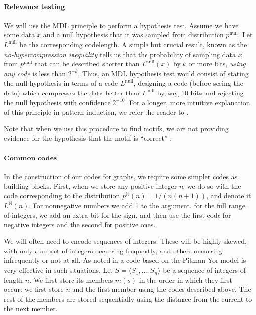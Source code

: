 \documentclass[letterpaper]{article} %
\newcommand{\N}{{\mathbb N}}
\begin{document}

\paragraph{Relevance testing} We will use the MDL principle to perform a hypothesis test. Assume we have some data $x$ and a null hypothesis that it was sampled from distribution $p^\text{null}$. Let $L^\text{null}$ be the corresponding codelength. A simple but crucial result, known as the \emph{no-hypercompression inequality} \cite[p103]{grunwald2007minimum} tells us that the probability of sampling data $x$ from $p^\text{null}$ that can be described shorter than $L^\text{null}(x)$ by $k$ or more bits, \emph{using any code} is less than $2^{-k}$.
Thus, an MDL hypothesis test would consist of stating the null hypothesis in terms of a code $L^\text{null}$, designing a code (before seeing the data) which compresses the data better than $L^\text{null}$ by, say, 10 bits and rejecting the null hypothesis with confidence $2^{-10}$. For a longer, more intuitive explanation of this principle in pattern induction, we refer the reader to \cite[Section~2]{bloem2017large}.

Note that when we use this procedure to find motifs, we are not providing evidence for the hypothesis that the motif is ``correct'' \cite[Section~2]{bloem2017large}.
\paragraph{Common codes}
In the construction of our codes for graphs, we require some simpler codes as building blocks. First, when we store any positive integer $n$, we do so with the code corresponding to the distribution $p^\N(n) = 1/(n(n+1))$, and denote it $L^\N(n)$. For nonnegative numbers we add 1 to the argument. for the full range of integers, we add an extra bit for the sign, and then use the first code for negative integers and the second for positive ones.

We will often need to encode sequences of integers. These will be highly skewed, with only a subset of integers occurring frequently, and others occurring infrequently or not at all. As noted in \cite{de2016names} a code based on the Pitman-Yor model \cite{pitman1997two} is very effective in such situations. Let $S = \langle S_1, ..., S_n\rangle$ be a sequence of integers of length $n$. We first store its members $m(s)$ in the order in which they first occur: we first store $n$ and the first member using the codes described above. The rest of the members are stored sequentially using the distance from the current to the next member.
\end{document}
